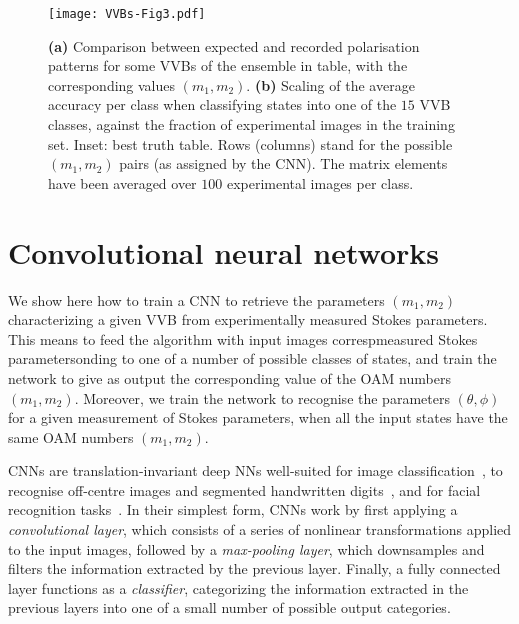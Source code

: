 \begin{figure}[tb]
    \centering
    \texttt{[image: VVBs-Fig3.pdf]}
    \caption{
	    \textbf{(a)} Comparison between expected and recorded polarisation patterns for some \acp{VVB} of the ensemble in table, with the corresponding values $(m_1,m_2)$.
	    \textbf{(b)} Scaling of the average accuracy per class when classifying states into one of the $15$ VVB classes,
	    against the fraction of experimental images in the training set. 
	    Inset: best truth table.
	    Rows (columns) stand for the possible $(m_1,m_2)$ pairs (as assigned by the CNN). The matrix elements have been averaged over $100$ experimental images per class.
    }%
    \label{fig:VVBs:resultsCNN}
\end{figure}



\section{Convolutional neural networks}
\label{sec:VVBs:CNNs}

We show here how to train a \ac{CNN} to retrieve the parameters $(m_1,m_2)$ characterizing a given VVB from experimentally measured Stokes parameters.
This means to feed the algorithm with input images correspmeasured Stokes parametersonding to one of a number of possible classes of states, and train the network to give as output the corresponding value of the OAM numbers $(m_1,m_2)$.
Moreover, we train the network to recognise the parameters $(\theta,\phi)$ for a given measurement of Stokes parameters, when all the input states have the same OAM numbers $(m_1,m_2)$.

\acp{CNN} are translation-invariant deep NNs well-suited for image classification~\cite{lecun2015deep}, to recognise off-centre images and segmented handwritten digits~\cite{simard2003best,ciresan2011flexible},
and for facial recognition tasks~\cite{matsugu2003subject}. 
In their simplest form, \acp{CNN} work by first applying a \emph{convolutional layer}, which consists of a series of nonlinear transformations applied to the input images, followed by a \emph{max-pooling layer}, which downsamples and filters the information extracted by the previous layer. Finally, a fully connected layer functions as a \emph{classifier}, categorizing the information extracted in the previous layers into one of a small number of possible output categories.

